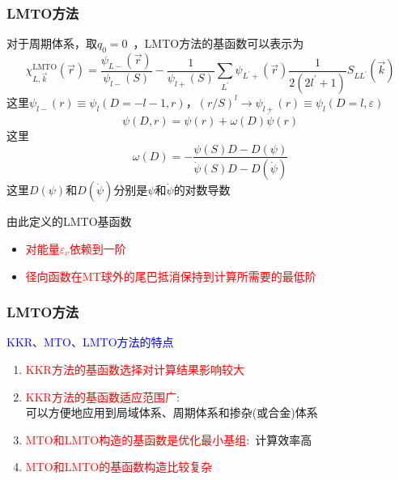 \documentclass[cjk,slidestop,compress,mathserif,blue]{beamer}
\begin{document}
\frame
{
	\frametitle{\textrm{LMTO}方法}
	对于周期体系，取$q_0=0$~，\textrm{LMTO}方法的基函数可以表示为
	\begin{displaymath}
		\chi_{L,\vec k}^{\mathrm{LMTO}}(\vec r)=\dfrac{\psi_{L-}(\vec r)}{\psi_{l-}(S)}-\dfrac1{\psi_{l+}(S)}\sum_{L^{\prime}}\psi_{L^{\prime}+}(\vec r)\dfrac1{2(2l^{\prime}+1)}S_{LL^{\prime}}(\vec k)
	\end{displaymath}
	这里$\psi_{l-}(r)\equiv\psi_l(D=-l-1,r)$，$(r/S)^l\rightarrow\psi_{l+}(r)\equiv\psi_l(D=l,\varepsilon)$
	$$\psi(D,r)=\psi(r)+\omega(D)\dot\psi(r)$$
	这里
	$$\omega(D)=-\dfrac{\psi(S)D-D(\psi)}{\dot\psi(S)D-D(\dot\psi)}$$
	这里$D(\psi)$和$D(\dot\psi)$分别是$\psi$和$\dot\psi$的对数导数

	由此定义的\textrm{LMTO}基函数
	\begin{itemize}
		\item \textcolor{red}{对能量$\varepsilon_v$依赖到一阶}
		\item \textcolor{red}{径向函数在\textrm{MT}球外的尾巴抵消保持到计算所需要的最低阶}
	\end{itemize}
}

\frame
{
	\frametitle{\textrm{LMTO}方法}
	\textcolor{blue}{\textrm{KKR}、\textrm{MTO}、\textrm{LMTO}方法的特点}
	\begin{enumerate}
   		\setlength{\itemsep}{15pt}
		\item \textcolor{red}{\textrm{KKR}方法的基函数选择对计算结果影响较大}
		\item \textcolor{red}{\textrm{KKR}方法的基函数适应范围广}:\\可以方便地应用到局域体系、周期体系和掺杂(或合金)体系
		\item \textcolor{red}{\textrm{MTO}和\textrm{LMTO}构造的基函数是优化最小基组}:~计算效率高
		\item \textcolor{red}{\textrm{MTO}和\textrm{LMTO}的基函数构造比较复杂}
	\end{enumerate}
}
\end{document}
